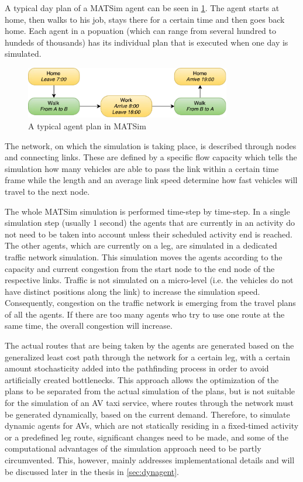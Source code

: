 A typical day plan of a MATSim agent can be seen in \cref{fig:typical_plan}. The
agent starts at home, then walks to his job, stays there for a certain time and then
goes back home. Each agent in a popuation (which can range from several hundred to
hundeds of thousands) has its individual plan that is executed when one day
is simulated.

\begin{figure}
    \centering
    \includegraphics[width=0.8\textwidth]{figures/simpleplan.pdf}
    \caption{A typical agent plan in MATSim}
    \label{fig:typical_plan}
\end{figure}

The network, on which the simulation is taking place, is described through nodes
and connecting links. These are defined by a specific flow capacity which tells the
simulation how many vehicles are able to pass the link within a certain time
frame while the length and an average link speed determine how fast vehicles
will travel to the next node.

The whole MATSim simulation is performed time-step by time-step. In a single simulation step (usually 1 second)
the agents that are currently in an activity do not need to be taken into account unless their scheduled
activity end is reached. The other agents, which are currently on a leg, are simulated in a
dedicated traffic network simulation. This simulation moves the agents according
to the capacity and current congestion from the start node to the end node of the
respective links. Traffic is not simulated on a micro-level (i.e. the vehicles
do not have distinct positions along the link) to increase the simulation
speed. Consequently, congestion on the traffic network is emerging from the travel
plans of all the agents. If there are too many agents who try to use one route
at the same time, the overall congestion will increase.

The actual routes that are being taken by the agents are generated based on the
generalized least cost path through the network for a certain leg, with a certain amount stochasticity
added into the pathfinding process in order to avoid artificially created bottlenecks.
This approach allows the optimization of the plans to be separated from the actual
simulation of the plans, but is not suitable for the simulation of an AV taxi service,
where routes through the network must be generated dynamically, based on the current
demand. Therefore, to simulate dynamic agents for AVs, which are not statically residing in a
fixed-timed activity or a predefined leg route, significant changes need
to be made, and some of the computational advantages of the simulation approach
need to be partly circumvented. This, however, mainly addresses implementational
details and will be discussed later in the thesis in \cref{sec:dynagent}.

